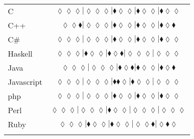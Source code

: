 \begin{table*}
{\begin{tabular}{l c}
C & $\scriptscriptstyle\lozenge\lozenge\lozenge|\lozenge\lozenge\lozenge|\blacklozenge\lozenge\lozenge|\blacklozenge\lozenge\lozenge|\blacklozenge\lozenge\lozenge$ \\
C++ & $\scriptscriptstyle\lozenge\lozenge\blacklozenge|\lozenge\lozenge\lozenge|\blacklozenge\lozenge\lozenge|\blacklozenge\lozenge\lozenge|\blacklozenge\lozenge\blacklozenge$ \\
C\# & $\scriptscriptstyle\lozenge\lozenge\lozenge|\lozenge\lozenge\lozenge|\blacklozenge\lozenge\lozenge|\blacklozenge\lozenge\lozenge|\blacklozenge\lozenge\lozenge$ \\
Haskell & $\scriptscriptstyle\lozenge\lozenge\lozenge|\blacklozenge\lozenge\lozenge|\blacklozenge\lozenge\blacklozenge|\lozenge\lozenge\lozenge|\lozenge\lozenge\lozenge$ \\
Java & $\scriptscriptstyle\lozenge\lozenge\lozenge|\lozenge\lozenge\lozenge|\blacklozenge\lozenge\blacklozenge|\blacklozenge\lozenge\lozenge|\blacklozenge\lozenge\blacklozenge$ \\
Javascript & $\scriptscriptstyle\lozenge\lozenge\lozenge|\lozenge\lozenge\lozenge|\blacklozenge\blacklozenge\lozenge|\blacklozenge\lozenge\lozenge|\lozenge\lozenge\lozenge$ \\
{\sc php} & $\scriptscriptstyle\lozenge\lozenge\lozenge|\lozenge\lozenge\lozenge|\blacklozenge\lozenge\lozenge|\blacklozenge\lozenge\lozenge|\blacklozenge\lozenge\lozenge$ \\
Perl & $\scriptscriptstyle\lozenge\lozenge\lozenge|\lozenge\lozenge\lozenge|\blacklozenge\lozenge\lozenge|\lozenge\lozenge\lozenge|\lozenge\lozenge\lozenge$ \\
Ruby & $\scriptscriptstyle\lozenge\lozenge\lozenge|\blacklozenge\lozenge\lozenge|\blacklozenge\lozenge\lozenge|\lozenge\lozenge\blacklozenge|\lozenge\blacklozenge\lozenge$ \\

\hline
& \\
\end{tabular}
} 
\end{table*}
